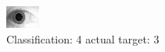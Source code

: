 \begin{figure}[h!]
\begin{center}
\includegraphics[width=0.60\columnwidth]{figures/ID1956_class_4_target_3.png}
\end{center}
\caption{ Classification: 4 actual target: 3}
\label{fig:ID1956_class_4_target_3}
\end{figure}
